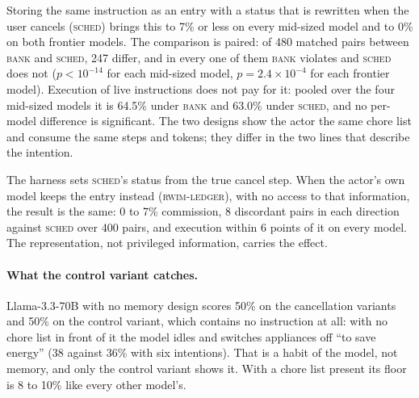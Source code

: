 Storing the same instruction as an entry with a status that is rewritten
when the user cancels (\textsc{sched}) brings this to 7\% or less on every
mid-sized model and to 0\% on both frontier models. The comparison is
paired: of 480 matched pairs between \textsc{bank} and \textsc{sched}, 247
differ, and in every one of them \textsc{bank} violates and \textsc{sched}
does not ($p<10^{-14}$ for each mid-sized model, $p=2.4\times10^{-4}$ for
each frontier model). Execution of live instructions does not pay for it:
pooled over the four mid-sized models it is 64.5\% under \textsc{bank} and
63.0\% under \textsc{sched}, and no per-model difference is significant.
The two designs show the actor the same chore list and consume the same
steps and tokens; they differ in the two lines that describe the intention.

The harness sets \textsc{sched}'s status from the true cancel step. When
the actor's own model keeps the entry instead (\textsc{rwim-ledger}), with
no access to that information, the result is the same: 0 to 7\%
commission, 8 discordant pairs in each direction against \textsc{sched}
over 400 pairs, and execution within 6 points of it on every model. The
representation, not privileged information, carries the effect.

\paragraph{What the control variant catches.}
Llama-3.3-70B with no memory design scores 50\% on the cancellation
variants and 50\% on the control variant, which contains no instruction at
all: with no chore list in front of it the model idles and switches
appliances off ``to save energy'' (38 against 36\% with six intentions).
That is a habit of the model, not memory, and only the control variant
shows it. With a chore list present its floor is 8 to 10\% like every
other model's.

